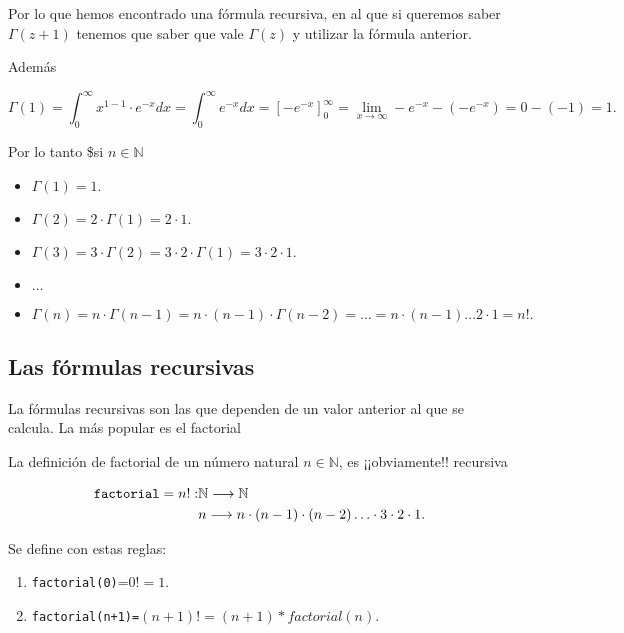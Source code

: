 \documentclass[
]{article}
\providecommand{\tightlist}{%
  \setlength{\itemsep}{0pt}\setlength{\parskip}{0pt}}
\begin{document}
Por lo que hemos encontrado una fórmula recursiva, en al que si queremos
saber \(\Gamma(z+1)\) tenemos que saber que vale \(\Gamma(z)\) y
utilizar la fórmula anterior.

Además

\[\Gamma(1)=\int_0^{\infty} x^{1-1} \cdot e^{-x}  dx=\int_0^{\infty}  e^{-x}  dx=
\left[-e^{-x}\right]_{0}^{\infty}=\lim_{x\to \infty} -e^{-x}- \left( -e^{-x}\right)=0-(-1)=1.\]

Por lo tanto \$si \(n\in\mathbb{N}\)

\begin{itemize}
\tightlist
\item
  \(\Gamma(1)=1.\)
\item
  \(\Gamma(2)=2 \cdot \Gamma(1)=2\cdot 1.\)
\item
  \(\Gamma(3)= 3 \cdot\Gamma(2)= 3 \cdot 2 \cdot \Gamma(1)= 3\cdot 2 \cdot 1.\)
\item
  \(\ldots\)
\item
  \(\Gamma(n)= n \cdot\Gamma(n-1)= n \cdot (n-1) \cdot \Gamma(n-2)=\ldots=n\cdot (n-1)\ldots 2\cdot 1=n!.\)
\end{itemize}

\hypertarget{las-fuxf3rmulas-recursivas}{%
\subsection{Las fórmulas recursivas}\label{las-fuxf3rmulas-recursivas}}

La fórmulas recursivas son las que dependen de un valor anterior al que
se calcula. La más popular es el factorial

La definición de factorial de un número natural \(n\in\mathbb{N}\), es
¡¡obviamente!! recursiva

\[
\begin{aligned}
\verb+factorial+ = n!: & \mathbb{N} \longrightarrow  \mathbb{N}\\
& n \longrightarrow  n\cdot (n-1)\cdot (n-2) \ldots \cdot 3\cdot 2\cdot 1.
\end{aligned}
\]

Se define con estas reglas:

\begin{enumerate}
\def\labelenumi{\arabic{enumi}.}
\tightlist
\item
  \texttt{factorial(0)}=\(0!=1\).
\item
  \texttt{factorial(n+1)=}\((n+1)!=(n+1)*factorial(n).\)
\end{enumerate}
\end{document}
